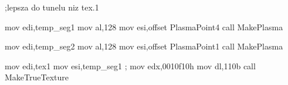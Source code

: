 ;lepsza do tunelu niz tex.1

	mov   edi,temp_seg1
	mov   al,128
	mov   esi,offset PlasmaPoint4
	call  MakePlasma

	mov   edi,temp_seg2
	mov   al,128
	mov   esi,offset PlasmaPoint1
	call  MakePlasma

	mov   edi,tex1
	mov   esi,temp_seg1
;	 mov   edx,0010f10h
	mov dl,110b
	call  MakeTrueTexture

